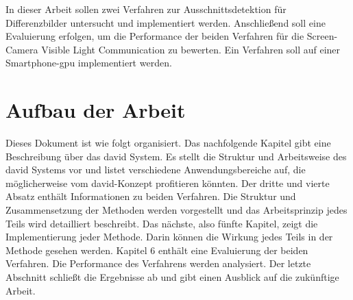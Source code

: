 In dieser Arbeit sollen zwei Verfahren zur Ausschnittsdetektion für Differenzbilder untersucht und implementiert werden. Anschließend soll eine Evaluierung erfolgen, um die Performance der beiden Verfahren für die Screen-Camera Visible Light Communication zu bewerten. Ein Verfahren soll auf einer Smartphone-\gls{gpu} implementiert werden.


\section{Aufbau der Arbeit} 

Dieses Dokument ist wie folgt organisiert. Das nachfolgende Kapitel gibt eine Beschreibung über das \gls{david} System. Es stellt die Struktur und Arbeitsweise des \gls{david} Systems vor und listet verschiedene Anwendungsbereiche auf, die möglicherweise vom \gls{david}-Konzept profitieren könnten. Der dritte und vierte Absatz enthält Informationen zu beiden Verfahren. Die Struktur und Zusammensetzung der Methoden werden vorgestellt und das Arbeitsprinzip jedes Teils wird detailliert beschreibt. Das nächste, also fünfte Kapitel, zeigt die Implementierung jeder Methode. Darin können die Wirkung jedes Teils in der Methode gesehen werden. %
Kapitel 6 enthält eine Evaluierung der beiden Verfahren. Die Performance des Verfahrens werden analysiert. Der letzte Abschnitt schließt die Ergebnisse ab und gibt einen Ausblick auf die zukünftige Arbeit.